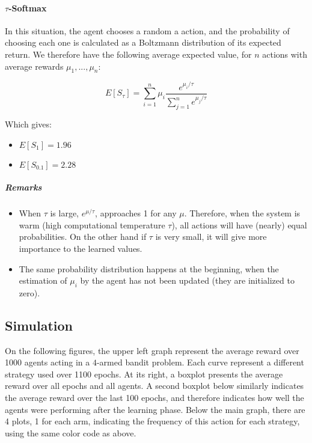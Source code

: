 \documentclass[a4paper,11pt]{article}
\begin{document}
\paragraph{$\tau$-Softmax}
In this situation, the agent chooses a random a action, and the probability of choosing each one is calculated as a Boltzmann distribution of its expected return. We therefore have the following average expected value, for $n$ actions with average rewards $\mu_1, ..., \mu_{n}$:

\begin{equation}
E[S_{\tau}] = \sum_{i=1}^{n} \mu_{i} \frac{e^{\mu_i/\tau}}{\sum_{j=1}^{n} e^{\mu_j/\tau}}
\label{eq:softmax}
\end{equation}

Which gives:
\begin{itemize}
  \item{$ E[S_{1}] = 1.96 $}
  \item{$ E[S_{0.1}] = 2.28 $}
\end{itemize}

\subparagraph{Remarks}
\begin{itemize}
  \item When $\tau$ is large, $e^{\mu/\tau}$, approaches 1 for any $\mu$. Therefore, when the system is warm (high computational temperature $\tau$), all actions will have (nearly) equal probabilities. On the other hand if $\tau$ is very small, it  will give more importance to the learned values.
  \item The same probability distribution happens at the beginning, when the estimation of $\mu_i$ by the agent has not been updated (they are initialized to zero).
\end{itemize}

\subsection{Simulation}
On the following figures, the upper left graph represent the average reward over 1000 agents acting in a $4$-armed bandit problem. Each curve represent a different strategy used over 1100 epochs. At its right, a boxplot presents the average reward over all epochs and all agents. A second boxplot below similarly indicates the average reward over the last 100 epochs, and therefore indicates how well the agents were performing after the learning phase. Below the main graph, there are 4 plots, 1 for each arm, indicating the frequency of this action for each strategy, using the same color code as above.
\end{document}

